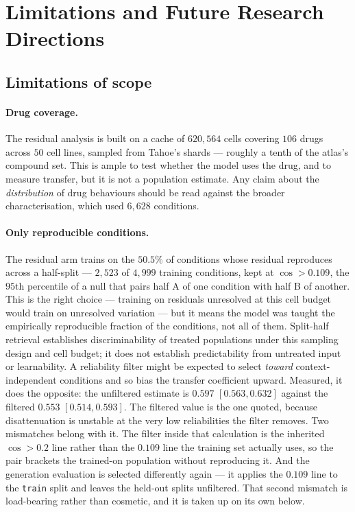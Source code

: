 \section{Limitations and Future Research Directions}
\label{sec:limitations}

\subsection{Limitations of scope}

\paragraph{Drug coverage.} The residual analysis is built on a cache of $620{,}564$ cells covering
$106$ drugs across $50$ cell lines, sampled from Tahoe's shards --- roughly a tenth of the atlas's
compound set. This is ample to test whether the model uses the drug, and to measure transfer, but it
is not a population estimate. Any claim about the \emph{distribution} of drug behaviours should be
read against the broader characterisation, which used $6{,}628$ conditions.

\paragraph{Only reproducible conditions.} The residual arm trains on the $50.5\%$ of conditions whose
residual reproduces across a half-split --- $2{,}523$ of $4{,}999$ training conditions, kept at
$\cos > 0.109$, the $95$th percentile of a null that pairs half A of one condition with half B of
another. This is the right choice --- training on
residuals unresolved at this cell budget would train on unresolved variation --- but it means the
model was taught the empirically reproducible fraction of the conditions, not all of them.
Split-half retrieval establishes discriminability of treated populations under this sampling
design and cell budget; it does not establish predictability from untreated input or learnability.
A reliability filter might be expected to select \emph{toward} context-independent conditions and so bias the transfer coefficient upward. Measured, it does the opposite: the unfiltered estimate is $0.597$ \nolinebreak[3]$[0.563, 0.632]$ against the filtered $0.553$ \nolinebreak[3]$[0.514, 0.593]$. The filtered value is the one quoted, because disattenuation is unstable at the very low reliabilities the filter removes. Two mismatches belong with it. The filter inside that calculation is the inherited $\cos > 0.2$ line rather than the $0.109$ line the training set actually uses, so the pair brackets the trained-on population without reproducing it. And the generation evaluation is selected differently again --- it applies the $0.109$ line to the \texttt{train} split and leaves the held-out splits unfiltered. That second mismatch is load-bearing rather than cosmetic, and it is taken up on its own below.

